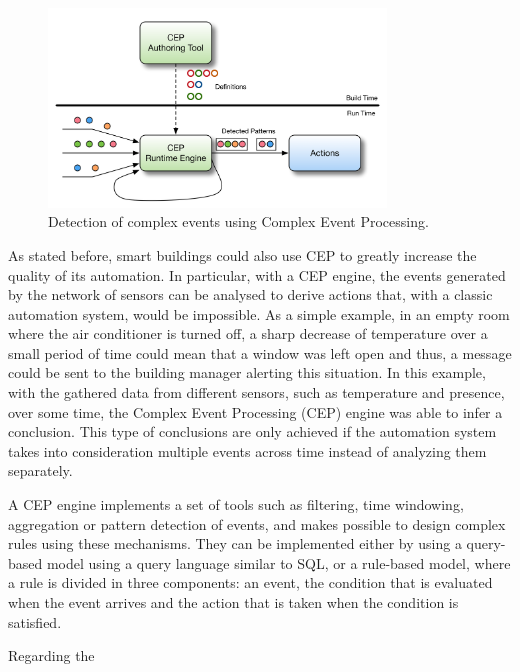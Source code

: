 \begin{figure}[H]
	\centering
	\includegraphics[width=0.8\textwidth]{figures/cep1.png}
	\caption{Detection of complex events using Complex Event Processing.}
	\label{fig:cep}
\end{figure}

As stated before, smart buildings could also use CEP to greatly increase the quality of its automation. In particular, with a CEP engine, the events generated by the network of sensors can be analysed to derive actions that, with a classic automation system, would be impossible. As a simple example, in an empty room where the air conditioner is turned off, a sharp decrease of temperature over a small period of time could mean that a window was left open and thus, a message could be sent to the building manager alerting this situation. In this example, with the gathered data from different sensors, such as temperature and presence, over some time, the Complex Event Processing (CEP) engine was able to infer a conclusion. This type of conclusions are only achieved if the automation system takes into consideration multiple events across time instead of analyzing them separately.


A CEP engine implements a set of tools such as filtering, time windowing, aggregation or pattern detection of events, and makes possible to design complex rules using these mechanisms. They can be implemented either by using a query-based model using a query language similar to SQL, or a rule-based model, where a rule is divided in three components: an event, the condition that is evaluated when the event arrives and the action that is taken when the condition is satisfied.

Regarding the 

